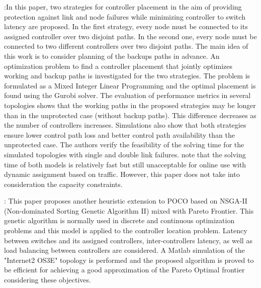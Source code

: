 \documentclass[a4paper,10pt]{article}
\begin{document}
\cite{ViMa16}:In this paper, two strategies for controller placement in the aim of providing protection against link and node failures while minimizing controller to switch latency  are proposed. In the first strategy, every node must be connected to its assigned controller over two disjoint paths. In the second one, every node must be connected to two different controllers over two disjoint paths. The main idea of this work is to consider planning of the backups paths in advance. An optimization problem to find a controller placement that jointly optimizes working and backup paths is investigated for the two strategies. The problem is formulated as a Mixed Integer Linear Programming and the optimal placement is found using the Gurobi solver. The evaluation of performance metrics in several topologies shows that the working paths in the proposed strategies may be longer than in the unprotected case (without backup paths). This difference decreases as the number of controllers increases. Simulations also show that both strategies ensure lower control path loss and better control path availability than the unprotected case. The authors verify the feasibility of the solving time for the simulated topologies with single and double link failures. note that the solving time of both models is relatively fast but still unacceptable for online use with dynamic assignment based on traffic. However, this paper does not take into consideration the capacity constraints.

\cite{JaAh15}: This paper proposes another heuristic extension to POCO based on NSGA-II (Non-dominated Sorting Genetic Algorithm II)  mixed with Pareto Frontier. This genetic algorithm is normally used in discrete and continuous optimization problems and this model is applied to the controller location problem. Latency between switches and its assigned controllers, inter-controllers latency, as well as load balancing between controllers are considered. A Matlab simulation of the "Internet2 OS3E" topology is performed and the proposed algorithm is proved to be efficient for achieving a good approximation of the Pareto Optimal frontier considering these objectives. 

\end{document}
